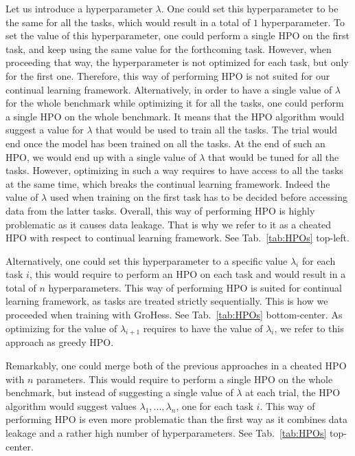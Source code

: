 \documentclass[11pt]{article}
\begin{document}
\vspace{2mm}
\noindent
Let us introduce a hyperparameter $\lambda$. One could set this hyperparameter to be the same for all the tasks, which would result in a total of $1$ hyperparameter. To set the value of this hyperparameter, one could perform a single HPO on the first task, and keep using the same value for the forthcoming task. However, when proceeding that way, the hyperparameter is not optimized for each task, but only for the first one. Therefore, this way of performing HPO is not suited for our continual learning framework. Alternatively, in order to have a single value of $\lambda$ for the whole benchmark while optimizing it for all the tasks, one could perform a single HPO on the whole benchmark. It means that the HPO algorithm would suggest a value for $\lambda$ that would be used to train all the tasks. The trial would end once the model has been trained on all the tasks. At the end of such an HPO, we would end up with a single value of $\lambda$ that would be tuned for all the tasks. However, optimizing in such a way requires to have access to all the tasks at the same time, which breaks the continual learning framework. Indeed the value of $\lambda$ used when training on the first task has to be decided before accessing data from the latter tasks. Overall, this way of performing HPO is highly problematic as it causes data leakage. That is why we refer to it as a cheated HPO with respect to continual learning framework. See Tab.~\ref{tab:HPOs} top-left.

\vspace{2mm}
\noindent
Alternatively, one could set this hyperparameter to a specific value $\lambda_i$ for each task $i$, this would require to perform an HPO on each task and would result in a total of $n$ hyperparameters. This way of performing HPO is suited for continual learning framework, as tasks are treated strictly sequentially. This is how we proceeded when training with GroHess. See Tab.~\ref{tab:HPOs} bottom-center. As optimizing for the value of $\lambda_{i+1}$ requires to have the value of $\lambda_i$, we refer to this approach as greedy HPO.

\vspace{2mm}
\noindent
Remarkably, one could merge both of the previous approaches in a cheated HPO with $n$ parameters. This would require to perform a single HPO on the whole benchmark, but instead of suggesting a single value of $\lambda$ at each trial, the HPO algorithm would suggest values $\lambda_1,...,\lambda_n$, one for each task $i$. This way of performing HPO is even more problematic than the first way as it combines data leakage and a rather high number of hyperparameters. See Tab.~\ref{tab:HPOs} top-center.
\end{document}
